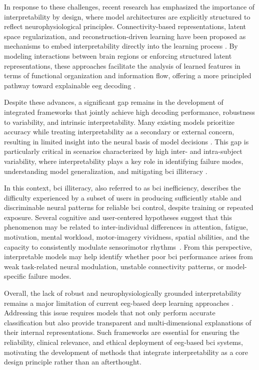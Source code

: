 In response to these challenges, recent research has emphasized the importance of interpretability by design, where model architectures are explicitly structured to reflect neurophysiological principles. Connectivity-based representations, latent space regularization, and reconstruction-driven learning have been proposed as mechanisms to embed interpretability directly into the learning process \cite{rolls2022effective}. By modeling interactions between brain regions or enforcing structured latent representations, these approaches facilitate the analysis of learned features in terms of functional organization and information flow, offering a more principled pathway toward explainable \gls{eeg} decoding \cite{faes2017information}.

Despite these advances, a significant gap remains in the development of integrated frameworks that jointly achieve high decoding performance, robustness to variability, and intrinsic interpretability. Many existing models prioritize accuracy while treating interpretability as a secondary or external concern, resulting in limited insight into the neural basis of model decisions \cite{lotte2018review}. This gap is particularly critical in scenarios characterized by high inter- and intra-subject variability, where interpretability plays a key role in identifying failure modes, understanding model generalization, and mitigating \gls{bci} illiteracy \cite{horowitz2021external}.

{In this context, \gls{bci} illiteracy, also referred to as \gls{bci} inefficiency, describes the difficulty experienced by a subset of users in producing sufficiently stable and discriminable neural patterns for reliable \gls{bci} control, despite training or repeated exposure. Several cognitive and user-centered hypotheses suggest that this phenomenon may be related to inter-individual differences in attention, fatigue, motivation, mental workload, motor-imagery vividness, spatial abilities, and the capacity to consistently modulate sensorimotor rhythms~\cite{jeunet2015predicting,leeuwis2021vividness,ahn2013high}. From this perspective, interpretable models may help identify whether poor \gls{bci} performance arises from weak task-related neural modulation, unstable connectivity patterns, or model-specific failure modes.}

Overall, the lack of robust and neurophysiologically grounded interpretability remains a major limitation of current \gls{eeg}-based deep learning approaches \cite{bouazizi2024interpretability}. Addressing this issue requires models that not only perform accurate classification but also provide transparent and multi-dimensional explanations of their internal representations. Such frameworks are essential for ensuring the reliability, clinical relevance, and ethical deployment of \gls{eeg}-based \gls{bci} systems, motivating the development of methods that integrate interpretability as a core design principle rather than an afterthought.

